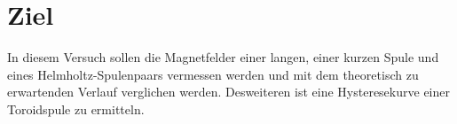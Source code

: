 \section{Ziel}
\label{sec:Ziel}
In diesem Versuch sollen die Magnetfelder einer langen, einer kurzen Spule und eines
Helmholtz-Spulenpaars vermessen werden und mit dem theoretisch zu erwartenden
Verlauf verglichen werden. Desweiteren ist eine Hysteresekurve einer Toroidspule
zu ermitteln.
